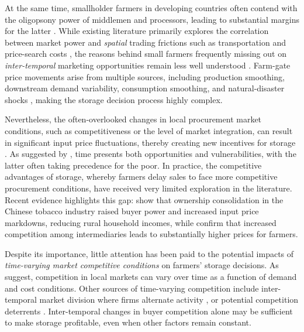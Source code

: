 At the same time, smallholder farmers in developing countries often contend with the oligopsony power of middlemen and processors, leading to substantial margins for the latter \citep{rogers_rich_1994assessing}. While existing literature primarily explores the correlation between market power and \textit{spatial} trading frictions such as transportation and price-search costs \citep{bergquist_dinerstein_2020, mitra_mookherjee_torero_visaria_2018, ranjan_2017, antras_costinot_2011, jung2022structural}, the reasons behind small farmers frequently missing out on \textit{inter-temporal} marketing opportunities remain less well understood \citep{williams1991storage, wright1984welfare, ruhinduka2020smallholder, lai2003optimal}. Farm-gate price movements arise from multiple sources, including production smoothing, downstream demand variability, consumption smoothing, and natural-disaster shocks \citep{tomek2001risk, channa2022overcoming}, making the storage decision process highly complex.



Nevertheless, the often-overlooked changes in local procurement market conditions, such as competitiveness or the level of market integration, can result in significant input price fluctuations, thereby creating new incentives for storage \citep{dries2009farmers, kopp2021farmers}. As suggested by \cite{zimmerman2003asset}, time presents both opportunities and vulnerabilities, with the latter often taking precedence for the poor. In practice, the competitive advantages of storage, whereby farmers delay sales to face more competitive procurement conditions, have received very limited exploration in the literature. Recent evidence highlights this gap: \cite{rubens2023market} show that ownership consolidation in the Chinese tobacco industry raised buyer power and increased input price markdowns, reducing rural household incomes, while \cite{chatterjee2023market} confirm that increased competition among intermediaries leads to substantially higher prices for farmers.



Despite its importance, little attention has been paid to the potential impacts of \textit{time-varying market competitive conditions} on farmers' storage decisions. As \cite{sudhir2005time} suggest, competition in local markets can vary over time as a function of demand and cost conditions. Other sources of time-varying competition include inter-temporal market division where firms alternate activity \citep{herings2005intertemporal}, or potential competition deterrents \citep{gilbert1989role, stiglitz1981potential}. Inter-temporal changes in buyer competition alone may be sufficient to make storage profitable, even when other factors remain constant.



